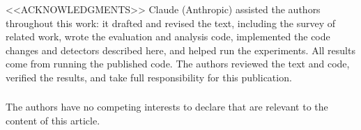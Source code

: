 \documentclass[runningheads]{llncs}
\begin{document}
\begin{credits}
\subsubsection{\ackname} <<ACKNOWLEDGMENTS>> Claude (Anthropic) assisted the authors throughout this work: it drafted and revised the text, including the survey of related work, wrote the evaluation and analysis code, implemented the code changes and detectors described here, and helped run the experiments. All results come from running the published code. The authors reviewed the text and code, verified the results, and take full responsibility for this publication.

\subsubsection{\discintname} The authors have no competing interests to declare that are relevant to the content of this article.
\end{credits}



\end{document}
